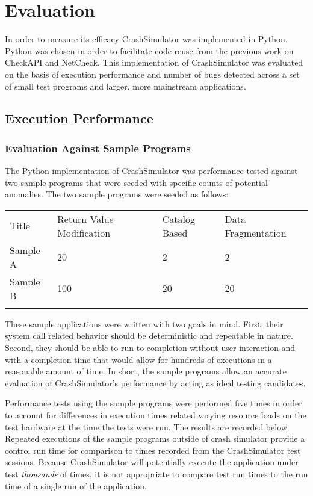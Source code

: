 \section{Evaluation}

    In order to measure its efficacy CrashSimulator was implemented in Python. Python was chosen in order to facilitate
    code reuse from the previous work on CheckAPI and NetCheck. This implementation of CrashSimulator was evaluated on
    the basis of execution performance and number of bugs detected across a set of small test programs and larger, more
    mainstream applications.



    \subsection{Execution Performance}

        \subsubsection{Evaluation Against Sample Programs} The Python implementation of CrashSimulator was performance
        tested against two sample programs that were seeded with specific counts of potential anomalies. The two sample
        programs were seeded as follows:

            \begin{tabular}{l  l  l  l}
                \toprule{}
                    Title & Return Value Modification & Catalog Based & Data Fragmentation \\
                    Sample A & 20 & 2 & 2 \\
                    Sample B & 100 & 20 & 20 \\
                \bottomrule{}
            \end{tabular}

            These sample applications were written with two goals in mind. First, their system call related behavior
            should be deterministic and repeatable in nature. Second, they should be able to run to completion without
            user interaction and with a completion time that would allow for hundreds of executions in a reasonable
            amount of time. In short, the sample programs allow an accurate evaluation of CrashSimulator's performance
            by acting as ideal testing candidates.

            Performance tests using the sample programs were performed five times in order to account for differences in
            execution times related varying resource loads on the test hardware at the time the tests were run. The
            results are recorded below. Repeated executions of the sample programs outside of crash simulator provide a
            control run time for comparison to times recorded from the CrashSimulator test sessions. Because
            CrashSimulator will potentially execute the application under test \emph{thousands} of times, it is not
            appropriate to compare test run times to the run time of a single run of the application.

